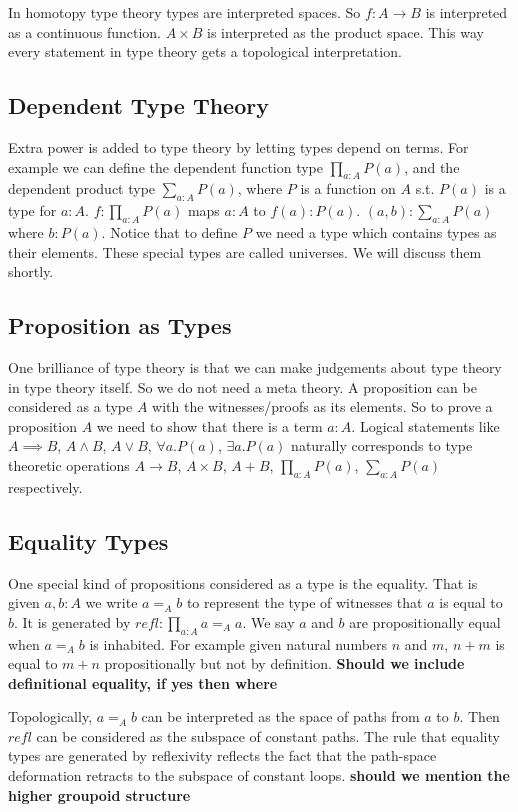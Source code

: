 \documentclass[10pt]{article}
\theoremstyle{definition}
\theoremstyle{plain}
\theoremstyle{remark}
\begin{document}
In homotopy type theory types are interpreted spaces. So $f : A \to B$ is 
interpreted as a continuous function. $A \times B$ is interpreted as the product space.
This way every statement in type theory gets a topological interpretation.

\subsection{Dependent Type Theory}
Extra power is added to type theory by letting types depend on terms. For example we can 
define the dependent function type $\prod_{a : A} P(a)$, and the dependent product type
$\sum_{a : A} P(a)$, where $P$ is a function on $A$ s.t. $P(a)$ is a type for $a : A$. 
$f : \prod_{a : A} P(a)$ maps $a : A$ to $f(a) : P(a)$. $(a,b) : \sum_{a : A} P(a)$ where
$b : P(a)$. Notice that to define $P$ we need a type which contains types as their elements.
These special types are called universes. We will discuss them shortly. 
 
\subsection{Proposition as Types}
One brilliance of type theory is that we can make judgements about type theory in type theory
itself. So we do not need a meta theory. A proposition can be considered as a type $A$ with 
the witnesses/proofs as its elements. So to prove a proposition $A$ we need to show that 
there is a term $a : A$. Logical statements like $A \implies B$, $A \wedge B$, $A \vee B$, 
$\forall a. P(a)$, $\exists a. P(a)$ naturally corresponds to type theoretic operations 
$A \to B$, $A \times B$, $A + B$, $\prod_{a : A} P(a)$, $\sum_{a : A} P(a)$
respectively.\smallskip

\subsection{Equality Types}
One special kind of propositions considered as a type is the equality. That is given $a,b : A$ we
write $a =_A b$ to represent the type of witnesses that $a$ is equal to $b$. It is
generated by ${refl} :\prod_{a : A} a =_A a$. We say $a$ and
$b$ are propositionally equal when $a =_A b$ is inhabited. For example given natural
numbers $n$ and $m$, $n+m$ is equal to $m+n$ propositionally but not by definition.
\textbf{Should we include definitional equality, if yes then where}
\smallskip

Topologically, $a =_A b$ can be interpreted as the space of paths from $a$ to $b$. Then 
${refl}$ can be considered as the subspace of constant paths. The rule that equality
types are generated by reflexivity reflects the fact that the path-space deformation retracts
to the subspace of constant loops. \textbf{should we mention the higher groupoid structure	}
\end{document}
